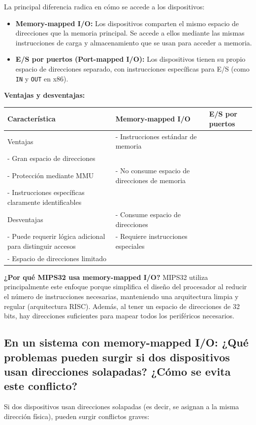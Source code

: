 \documentclass[12pt]{article}
\begin{document}
La principal diferencia radica en cómo se accede a los dispositivos:

\begin{itemize}
	\item \textbf{Memory-mapped I/O:} Los dispositivos comparten el mismo espacio de direcciones que la memoria principal. Se accede a ellos mediante las mismas instrucciones de carga y almacenamiento que se usan para acceder a memoria.
	\item \textbf{E/S por puertos (Port-mapped I/O):} Los dispositivos tienen su propio espacio de direcciones separado, con instrucciones específicas para E/S (como \texttt{IN} y \texttt{OUT} en x86).
\end{itemize}

\textbf{Ventajas y desventajas:}

\begin{table}[h]
	\centering
	\begin{tabular}{|p{4cm}|p{5cm}|p{5cm}|}
		\hline
		\textbf{Característica} & \textbf{Memory-mapped I/O} & \textbf{E/S por puertos} \\
		\hline
		Ventajas & - Instrucciones estándar de memoria \\- Gran espacio de direcciones \\- Protección mediante MMU & - No consume espacio de direcciones de memoria \\- Instrucciones específicas claramente identificables \\
		\hline
		Desventajas & - Consume espacio de direcciones \\- Puede requerir lógica adicional para distinguir accesos & - Requiere instrucciones especiales \\- Espacio de direcciones limitado \\
		\hline
	\end{tabular}
\end{table}

\textbf{¿Por qué MIPS32 usa memory-mapped I/O?} MIPS32 utiliza principalmente este enfoque porque simplifica el diseño del procesador al reducir el número de instrucciones necesarias, manteniendo una arquitectura limpia y regular (arquitectura RISC). Además, al tener un espacio de direcciones de 32 bits, hay direcciones suficientes para mapear todos los periféricos necesarios.
	
\subsection{En un sistema con memory-mapped I/O: ¿Qué problemas pueden surgir si dos dispositivos usan direcciones solapadas? ¿Cómo se evita este conflicto?}
Si dos dispositivos usan direcciones solapadas (es decir, se asignan a la misma dirección física), pueden surgir conflictos graves:
\end{document}
